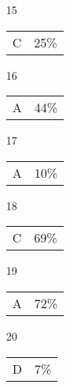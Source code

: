 \documentclass[12pt]{article}
\begin{document}
\begin{multicols}{5}
\begin{enumerate}
\item[15] \begin{tabular}{cc} C & 25\%\end{tabular}
\item[]
\item[16] \begin{tabular}{cc} A & 44\%\end{tabular}
\item[17] \begin{tabular}{cc} A & 10\%\end{tabular}
\item[18] \begin{tabular}{cc} C & 69\%\end{tabular}
\item[19] \begin{tabular}{cc} A & 72\%\end{tabular}
\item[20] \begin{tabular}{cc} D & 7\%\end{tabular}

\item[]


\end{enumerate}
\end{multicols}
\end{document}

